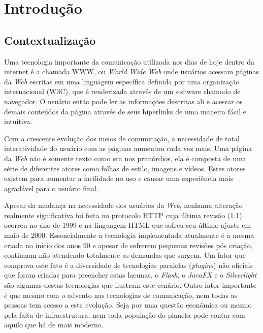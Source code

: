 \documentclass[espaco=simples,appendix=Name]{abnt}
\begin{document}
\capa
\folhaderosto
\sumario

\newcommand{\ingles}[1]{\textsl{#1}}
\newcommand{\bibTeX}{bib\kern-.13ex\TeX}

\chapter{Introdução}

\begin{description}

\section{Contextualização}

\item \noindent Uma tecnologia importante da comunicação utilizada nos dias de hoje dentro da internet é a chamada WWW, ou \ingles{World Wide Web} onde usuários acessam páginas da \ingles{Web} escritas em uma linguagem específica definida por uma organização internacional (W3C), que é renderizada através de um software chamado de navegador. O usuário então pode ler as informações descritas ali e acessar os demais conteúdos da página através de seus hiperlinks de uma maneira fácil e intuitiva.

Com a crescente evolução dos meios de comunicação, a necessidade de total interatividade do usuário com as páginas aumentou cada vez mais. Uma página da \ingles{Web} não é somente texto como era nos primórdios, ela é composta de uma série de diferentes atores como folhas de estilo, imagens e vídeos. Estes atores existem para aumentar a facilidade no uso e causar uma experiência mais agradável para o usuário final.

Apesar da mudança na necessidade dos usuários da \ingles{Web}, nenhuma alteração realmente significativa foi feita no protocolo HTTP cuja última revisão (1.1) ocorreu no ano de 1999 e na linguagem HTML que sofreu seu último ajuste em maio de 2000. Essencialmente a tecnologia implementada atualmente é a mesma criada no início dos anos 90 e apesar de sofrerem pequenas revisões pós criação, continuam não atendendo totalmente as demandas que surgem. Um fator que comprova este fato é a diversidade de tecnologias paralelas (\ingles{plugins}) não oficiais que foram criadas para preencher estas lacunas, o \ingles{Flash}, o \ingles{JavaFX} e o \ingles{Silverlight} são algumas destas tecnologias que ilustram este cenário. Outro fator importante é que mesmo com o advento nas tecnologias de comunicação, nem todas as pessoas tem acesso a esta evolução. Seja por uma questão econômica ou mesmo pela falta de infraestrutura, nem toda população do planeta pode contar com aquilo que há de mais moderno.


\end{description}
\end{document}

